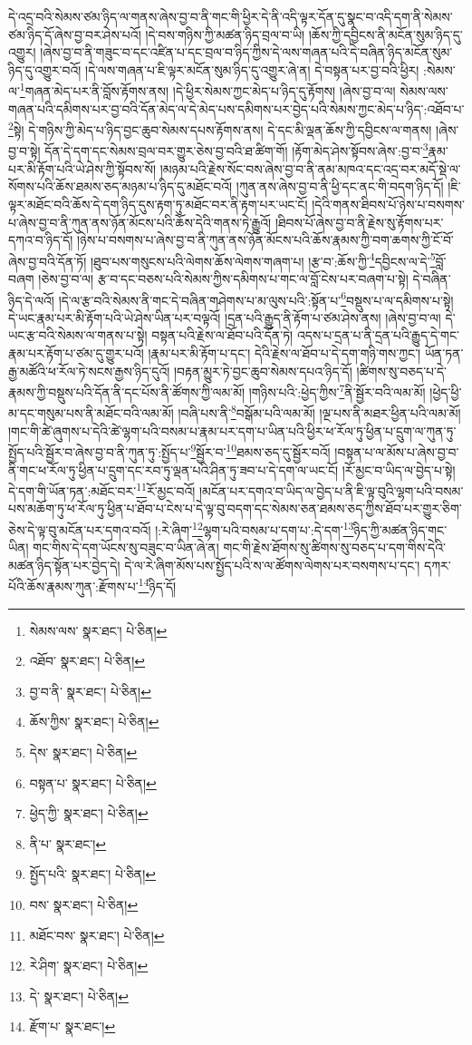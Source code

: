 དེ་འདྲ་བའི་སེམས་ཙམ་ཉིད་ལ་གནས་ཞེས་བྱ་བ་ནི་གང་གི་ཕྱིར་དེ་ནི་འདི་ལྟར་དོན་དུ་སྣང་བ་འདི་དག་ནི་སེམས་ཙམ་ཉིད་དོ་ཞེས་བྱ་བར་ཤེས་པའོ། །དེ་བས་གཉིས་ཀྱི་མཚན་ཉིད་བྲལ་བ་ཡི། །ཆོས་ཀྱི་དབྱིངས་ནི་མངོན་སུམ་ཉིད་དུ་འགྱུར། །ཞེས་བྱ་བ་ནི་གཟུང་བ་དང་འཛིན་པ་དང་བྲལ་བ་ཉིད་ཀྱིས་དེ་ལས་གཞན་པའི་དེ་བཞིན་ཉིད་མངོན་སུམ་ཉིད་དུ་འགྱུར་བའོ། །དེ་ལས་གཞན་པ་ཇི་ལྟར་མངོན་སུམ་ཉིད་དུ་འགྱུར་ཞེ་ན། དེ་བསྟན་པར་བྱ་བའི་ཕྱིར། :སེམས་ལ་\footnote{སེམས་ལས་  སྣར་ཐང་།  པེ་ཅིན། }གཞན་མེད་པར་ནི་བློས་རྟོགས་ནས། །དེ་ཕྱིར་སེམས་ཀྱང་མེད་པ་ཉིད་དུ་རྟོགས། །ཞེས་བྱ་བ་ལ། སེམས་ལས་གཞན་པའི་དམིགས་པར་བྱ་བའི་དོན་མེད་ལ་དེ་མེད་པས་དམིགས་པར་བྱེད་པའི་སེམས་ཀྱང་མེད་པ་ཉིད་:འཐོབ་པ་\footnote{འཐོབ་  སྣར་ཐང་།  པེ་ཅིན། }སྟེ། དེ་གཉིས་ཀྱི་མེད་པ་ཉིད་བྱང་ཆུབ་སེམས་དཔས་རྟོགས་ནས། དེ་དང་མི་ལྡན་ཆོས་ཀྱི་དབྱིངས་ལ་གནས། །ཞེས་བྱ་བ་སྟེ། དོན་དེ་དག་དང་སེམས་བྲལ་བར་གྱུར་ཅེས་བྱ་བའི་ཐ་ཚིག་གོ། །རྟོག་མེད་ཤེས་སྟོབས་ཞེས་:བྱ་བ་\footnote{བྱ་བ་ནི་  སྣར་ཐང་།  པེ་ཅིན། }རྣམ་པར་མི་རྟོག་པའི་ཡེ་ཤེས་ཀྱི་སྟོབས་སོ། །མཉམ་པའི་རྗེས་སོང་བས་ཞེས་བྱ་བ་ནི་ནམ་མཁའ་དང་འདྲ་བར་མདོ་སྡེ་ལ་སོགས་པའི་ཆོས་ཐམས་ཅད་མཉམ་པ་ཉིད་དུ་མཐོང་བའོ། །ཀུན་ནས་ཞེས་བྱ་བ་ནི་ཕྱི་དང་ནང་གི་བདག་ཉིད་དོ། །ཇི་ལྟར་མཐོང་བའི་ཆོས་དེ་དག་ཉིད་དུས་རྟག་ཏུ་མཐོང་བར་ནི་རྟག་པར་ཡང་ངོ། །དེའི་གནས་ཐིབས་པོ་ཉེས་པ་བསགས་པ་ཞེས་བྱ་བ་ནི་ཀུན་ནས་ཉོན་མོངས་པའི་ཆོས་དེའི་གནས་ཏེ་རྒྱུའོ། །ཐིབས་པོ་ཞེས་བྱ་བ་ནི་རྗེས་སུ་རྟོགས་པར་དཀའ་བ་ཉིད་དོ། །ཉེས་པ་བསགས་པ་ཞེས་བྱ་བ་ནི་ཀུན་ནས་ཉོན་མོངས་པའི་ཆོས་རྣམས་ཀྱི་བག་ཆགས་ཀྱི་ངོ་བོ་ཞེས་བྱ་བའི་དོན་ཏོ། །ཐུབ་པས་གསུངས་པའི་ལེགས་ཆོས་ལེགས་གཞག་པ། །རྩ་བ་:ཆོས་ཀྱི་\footnote{ཆོས་ཀྱིས་  སྣར་ཐང་།  པེ་ཅིན། }དབྱིངས་ལ་དེ་\footnote{དེས་  སྣར་ཐང་།  པེ་ཅིན། }བློ་བཞག །ཅེས་བྱ་བ་ལ། རྩ་བ་དང་བཅས་པའི་སེམས་ཀྱིས་དམིགས་པ་གང་ལ་བློ་ངེས་པར་བཞག་པ་སྟེ། དེ་བཞིན་ཉིད་དེ་ལའོ། །དེ་ལ་རྩ་བའི་སེམས་ནི་གང་དེ་བཞིན་གཤེགས་པ་མ་ལུས་པའི་:སྟོན་པ་\footnote{བསྟན་པ་  སྣར་ཐང་།  པེ་ཅིན། }བསྡུས་པ་ལ་དམིགས་པ་སྟེ། དེ་ཡང་རྣམ་པར་མི་རྟོག་པའི་ཡེ་ཤེས་ཡིན་པར་བལྟའོ། །དྲན་པའི་རྒྱུད་ནི་རྟོག་པ་ཙམ་ཤེས་ནས། །ཞེས་བྱ་བ་ལ། དེ་ཡང་རྩ་བའི་སེམས་ལ་གནས་པ་སྟེ། བསྟན་པའི་རྗེས་ལ་ཐོབ་པའི་དོན་ཏེ། འདས་པ་དྲན་པ་ནི་དྲན་པའི་རྒྱུད་དེ་གང་རྣམ་པར་རྟོག་པ་ཙམ་དུ་གྱུར་པའོ། །རྣམ་པར་མི་རྟོག་པ་དང་། དེའི་རྗེས་ལ་ཐོབ་པ་དེ་དག་གཉི་གས་ཀྱང་། ཡོན་ཏན་རྒྱ་མཚོའི་ཕ་རོལ་ཏེ་སངས་རྒྱས་ཉིད་དུའོ། །བརྟན་མྱུར་ཏེ་བྱང་ཆུབ་སེམས་དཔའ་ཉིད་དོ། །ཚིགས་སུ་བཅད་པ་དེ་རྣམས་ཀྱི་བསྡུས་པའི་དོན་ནི་དང་པོས་ནི་ཚོགས་ཀྱི་ལམ་མོ། །གཉིས་པའི་:ཕྱེད་ཀྱིས་\footnote{ཕྱེད་ཀྱི་  སྣར་ཐང་།  པེ་ཅིན། }ནི་སྦྱོར་བའི་ལམ་མོ། །ཕྱེད་ཕྱི་མ་དང་གསུམ་པས་ནི་མཐོང་བའི་ལམ་མོ། །བཞི་པས་ནི་\footnote{ནི་པ་  སྣར་ཐང་། }བསྒོམ་པའི་ལམ་མོ། །ལྔ་པས་ནི་མཐར་ཕྱིན་པའི་ལམ་མོ། །གང་གི་ཚེ་ཞུགས་པ་དེའི་ཚེ་ལྷག་པའི་བསམ་པ་རྣམ་པར་དག་པ་ཡིན་པའི་ཕྱིར་ཕ་རོལ་ཏུ་ཕྱིན་པ་དྲུག་ལ་ཀུན་ཏུ་སྤྱོད་པའི་སྦྱོར་བ་ཞེས་བྱ་བ་ནི་ཀུན་ཏུ་:སྤྱོད་པ་\footnote{སྤྱོད་པའི་  སྣར་ཐང་།  པེ་ཅིན། }སྦྱོར་བ་\footnote{བས་  སྣར་ཐང་།  པེ་ཅིན། }ཐམས་ཅད་དུ་སྦྱོར་བའོ། །བསྟན་པ་ལ་མོས་པ་ཞེས་བྱ་བ་ནི་གང་ཕ་རོལ་ཏུ་ཕྱིན་པ་དྲུག་དང་རབ་ཏུ་ལྡན་པའི་ཤིན་ཏུ་ཟབ་པ་དེ་དག་ལ་ཡང་ངོ། །རོ་མྱང་བ་ཡིད་ལ་བྱེད་པ་སྟེ། དེ་དག་གི་ཡོན་ཏན་:མཐོང་བར་\footnote{མཐོང་བས་  སྣར་ཐང་།  པེ་ཅིན། }རོ་མྱང་བའོ། །མངོན་པར་དགའ་བ་ཡིད་ལ་བྱེད་པ་ནི་ཇི་ལྟ་བུའི་ལྷག་པའི་བསམ་པས་མཆོག་ཏུ་ཕ་རོལ་ཏུ་ཕྱིན་པ་ཐོབ་པ་ངེས་པ་དེ་ལྟ་བུ་བདག་དང་སེམས་ཅན་ཐམས་ཅད་ཀྱིས་ཐོབ་པར་གྱུར་ཅིག་ཅེས་དེ་ལྟ་བུ་མངོན་པར་དགའ་བའོ། །:རེ་ཞིག་\footnote{རེ་ཤིག་  སྣར་ཐང་།  པེ་ཅིན། }ལྷག་པའི་བསམ་པ་དག་པ་:དེ་དག་\footnote{དེ་  སྣར་ཐང་།  པེ་ཅིན། }ཉིད་ཀྱི་མཚན་ཉིད་གང་ཡིན། གང་གིས་དེ་དག་ཡོངས་སུ་བཟུང་བ་ཡིན་ཞེ་ན། གང་གི་རྗེས་ཐོགས་སུ་ཚིགས་སུ་བཅད་པ་དག་གིས་དེའི་མཚན་ཉིད་སྟོན་པར་བྱེད་དེ། དེ་ལ་རེ་ཞིག་མོས་པས་སྤྱོད་པའི་ས་ལ་ཚོགས་ལེགས་པར་བསགས་པ་དང་། དཀར་པོའི་ཆོས་རྣམས་ཀུན་:རྫོགས་པ་\footnote{རྫོག་པ་  སྣར་ཐང་། }ཉིད་དོ། 